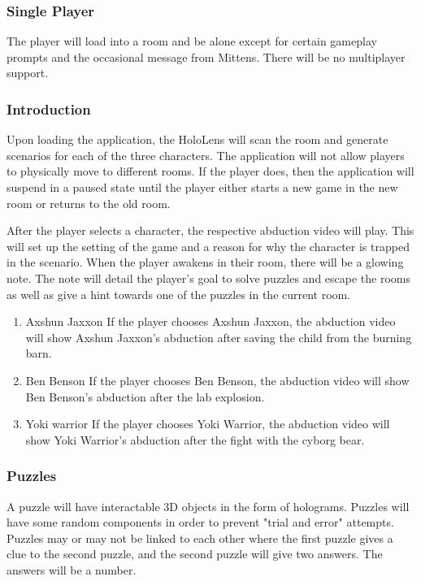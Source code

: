 \documentclass[12pt]{article}
\begin{document}
\subsubsection{Single Player}
\label{sec:org69ccb77}
The player will load into a room and be alone except for certain gameplay prompts and the occasional message from Mittens. There will be no multiplayer support.

\subsubsection{Introduction}
\label{sec:orgbcbb173}
Upon loading the application, the HoloLens will scan the room and generate scenarios for each of the three characters. The application will not allow players to physically move to different rooms. If the player does, then the application will suspend in a paused state until the player either starts a new game in the new room or returns to the old room.

After the player selects a character, the respective abduction video will play. This will set up the setting of the game and a reason for why the character is trapped in the scenario. When the player awakens in their room, there will be a glowing note. The note will detail the player's goal to solve puzzles and escape the rooms as well as give a hint towards one of the puzzles in the current room.

\begin{enumerate}
\item Axshun Jaxxon
\label{sec:org79550a8}
If the player chooses Axshun Jaxxon, the abduction video will show Axshun Jaxxon's abduction after saving the child from the burning barn.

\item Ben Benson
\label{sec:org238dd2a}
If the player chooses Ben Benson, the abduction video will show Ben Benson's abduction after the lab explosion.

\item Yoki warrior
\label{sec:orga6a54a5}
If the player chooses Yoki Warrior, the abduction video will show Yoki Warrior's abduction after the fight with the cyborg bear.
\end{enumerate}

\subsubsection{Puzzles}
\label{sec:orgd484908}
A puzzle will have interactable 3D objects in the form of holograms. Puzzles will have some random components in order to prevent "trial and error" attempts. Puzzles may or may not be linked to each other where the first puzzle gives a clue to the second puzzle, and the second puzzle will give two answers. The answers will be a number.
\end{document}
